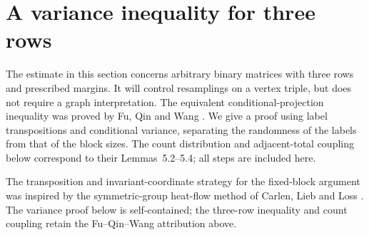 \section{A variance inequality for three rows}\label{row:section}

The estimate in this section concerns arbitrary binary matrices with three
rows and prescribed margins.  It will control resamplings on a vertex
triple, but does not require a graph interpretation.  The equivalent
conditional-projection inequality was proved by Fu, Qin and Wang
\cite[Theorem~5.1]{FQW26}.  We give a proof using label transpositions
and conditional variance, separating the randomness of the labels from
that of the block sizes. The count distribution and adjacent-total
coupling below correspond to their Lemmas~5.2--5.4; all steps are
included here.

The transposition and invariant-coordinate strategy for the fixed-block
argument was inspired by the symmetric-group heat-flow method of
Carlen, Lieb and Loss \cite[Section~2]{CLL06}.  The variance proof below
is self-contained; the three-row inequality and count coupling retain
the Fu--Qin--Wang attribution above.

